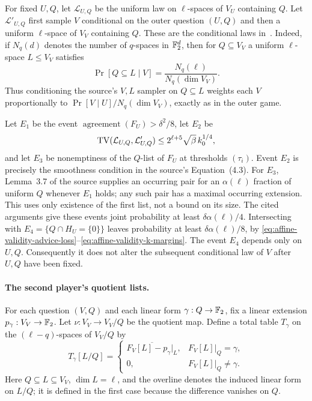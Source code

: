 For fixed $U,Q$, let $\mathcal L_{U,Q}$ be the uniform law on
$\ell$-spaces of $V_U$ containing $Q$.  Let $\mathcal L'_{U,Q}$
first sample $V$ conditional on the outer question $(U,Q)$ and then
a uniform $\ell$-space of $V_V$ containing $Q$.
These are the conditional laws in~\cite[Lemma~4.11]{DKKMS25}.
Indeed, if $N_q(d)$ denotes the number of $q$-spaces in $\mathbb F_2^d$, then
for $Q\subseteq V_V$ a uniform $\ell$-space $L\le V_V$ satisfies
\[
 \Pr[Q\subseteq L\mid V]=\frac{N_q(\ell)}{N_q(\dim V_V)}.
\]
Thus conditioning the source's $V,L$ sampler on $Q\subseteq L$
weights each $V$ proportionally to
$\Pr[V\mid U]/N_q(\dim V_V)$, exactly as in the outer game.

Let $E_1$ be the event
$\operatorname{agreement}(F_U)>\delta^2/8$, let $E_2$ be
\[
 \operatorname{TV}(\mathcal L_{U,Q},\mathcal L'_{U,Q})
 \le 2^{\ell+5}\sqrt\beta\,k_0^{1/4},
\]
and let $E_3$ be nonemptiness of the $Q$-list of $F_U$ at thresholds
$(\tau_i)$.  Event $E_2$ is precisely the smoothness condition in
the source's Equation~(4.3).
For $E_3$, Lemma~3.7 of the source supplies an occurring pair for an
$\alpha(\ell)$ fraction of uniform $Q$ whenever $E_1$ holds; any such
pair has a maximal occurring extension.  This uses only existence of
the first list, not a bound on its size.
The cited arguments give these events joint probability at least
$\delta\alpha(\ell)/4$.
Intersecting with $E_4=\{Q\cap H_U=\{0\}\}$ leaves probability at
least $\delta\alpha(\ell)/8$, by
\eqref{eq:affine-validity-advice-loss}--\eqref{eq:affine-validity-k-margins}.
The event $E_4$ depends only on $U,Q$.  Consequently it does not alter
the subsequent conditional law of $V$ after $U,Q$ have been fixed.

\paragraph{The second player's quotient lists.}
For each question $(V,Q)$ and each linear form $\gamma:Q\to\mathbb F_2$,
fix a linear extension $p_\gamma:V_V\to\mathbb F_2$.
Let $\nu:V_V\to V_V/Q$ be the quotient map.  Define a total table
$T_\gamma$ on the $(\ell-q)$-spaces of $V_V/Q$ by
\[
 T_\gamma[L/Q]=
 \begin{cases}
  \overline{F_V[L]-p_\gamma|_L},&F_V[L]|_Q=\gamma,\\
  0,&F_V[L]|_Q\ne\gamma.
 \end{cases}
\]
Here $Q\subseteq L\subseteq V_V$, $\dim L=\ell$, and the overline
denotes the induced linear form on $L/Q$; it is defined in the first
case because the difference vanishes on $Q$.


